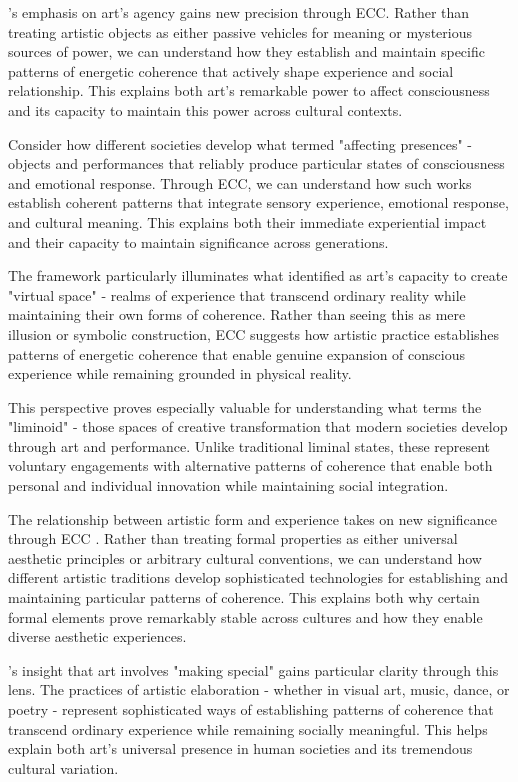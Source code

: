 \cite{armstrong1971affecting}'s emphasis on art's agency gains new precision through ECC. Rather than treating artistic objects as either passive vehicles for meaning or mysterious sources of power, we can understand how they establish and maintain specific patterns of energetic coherence that actively shape experience and social relationship. This explains both art's remarkable power to affect consciousness and its capacity to maintain this power across cultural contexts.

Consider how different societies develop what \cite{armstrong1971affecting} termed "affecting presences" - objects and performances that reliably produce particular states of consciousness and emotional response. Through ECC, we can understand how such works establish coherent patterns that integrate sensory experience, emotional response, and cultural meaning. This explains both their immediate experiential impact and their capacity to maintain significance across generations.

The framework particularly illuminates what \cite{langer1953feeling} identified as art's capacity to create "virtual space" - realms of experience that transcend ordinary reality while maintaining their own forms of coherence. Rather than seeing this as mere illusion or symbolic construction, ECC suggests how artistic practice establishes patterns of energetic coherence that enable genuine expansion of conscious experience while remaining grounded in physical reality.

This perspective proves especially valuable for understanding what \cite{turner1982ritual} terms the "liminoid" - those spaces of creative transformation that modern societies develop through art and performance. Unlike traditional liminal states, these represent voluntary engagements with alternative patterns of coherence that enable both personal and individual innovation while maintaining social integration.

The relationship between artistic form and experience takes on new significance through ECC \cite{kaeppler1985structured}. Rather than treating formal properties as either universal aesthetic principles or arbitrary cultural conventions, we can understand how different artistic traditions develop sophisticated technologies for establishing and maintaining particular patterns of coherence. This explains both why certain formal elements prove remarkably stable across cultures and how they enable diverse aesthetic experiences.

\cite{dissanayake1992homo}'s insight that art involves "making special" gains particular clarity through this lens. The practices of artistic elaboration - whether in visual art, music, dance, or poetry - represent sophisticated ways of establishing patterns of coherence that transcend ordinary experience while remaining socially meaningful. This helps explain both art's universal presence in human societies and its tremendous cultural variation.

